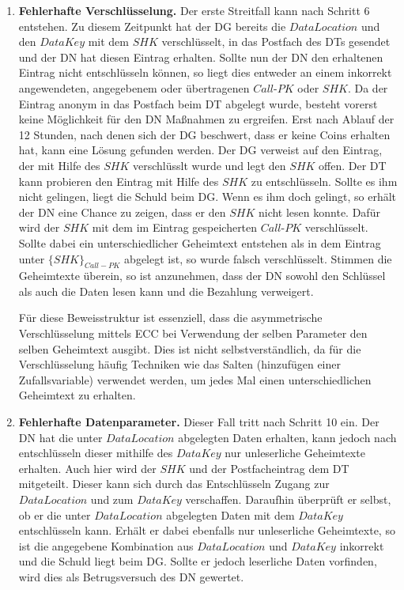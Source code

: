 \documentclass[
	fontsize=11pt,
	headings=small,
	parskip=half,           %
	bibliography=totoc,
	numbers=noenddot,       %
	open=any,               %
]{scrreprt}
\begin{document}
\begin{enumerate}
    \item \textbf{Fehlerhafte Verschlüsselung.}\label{case:IncorrectEncryption}
    Der erste Streitfall kann nach Schritt 6 entstehen. Zu diesem Zeitpunkt hat der DG bereits die $DataLocation$ und den $DataKey$ mit dem $SHK$ verschlüsselt, in das Postfach des DTs gesendet und der DN hat diesen Eintrag erhalten. Sollte nun der DN den erhaltenen Eintrag nicht entschlüsseln können, so liegt dies entweder an einem inkorrekt angewendeten, angegebenem oder übertragenen $Call$-$PK$ oder $SHK$. Da der Eintrag anonym in das Postfach beim DT abgelegt wurde, besteht vorerst keine Möglichkeit für den DN Maßnahmen zu ergreifen. Erst nach Ablauf der 12 Stunden, nach denen sich der DG beschwert, dass er keine Coins erhalten hat, kann eine Lösung gefunden werden. Der DG verweist auf den Eintrag, der mit Hilfe des $SHK$ verschlüsslt wurde und legt den $SHK$ offen. Der DT kann probieren den Eintrag mit Hilfe des $SHK$ zu entschlüsseln. Sollte es ihm nicht gelingen, liegt die Schuld beim DG. Wenn es ihm doch gelingt, so erhält der DN eine Chance zu zeigen, dass er den $SHK$ nicht lesen konnte. Dafür wird der $SHK$ mit dem im Eintrag gespeicherten $Call$-$PK$ verschlüsselt. Sollte dabei ein unterschiedlicher Geheimtext entstehen als in dem Eintrag unter $\{SHK\}_{Call-PK}$ abgelegt ist, so wurde falsch verschlüsselt. Stimmen die Geheimtexte überein, so ist anzunehmen, dass der DN sowohl den Schlüssel als auch die Daten lesen kann und die Bezahlung verweigert. 

    Für diese Beweisstruktur ist essenziell, dass die asymmetrische Verschlüsselung mittels ECC bei Verwendung der selben Parameter den selben Geheimtext ausgibt. Dies ist nicht selbstverständlich, da für die Verschlüsselung häufig Techniken wie das Salten (hinzufügen einer Zufallsvariable) verwendet werden, um jedes Mal einen unterschiedlichen Geheimtext zu erhalten.
    
    
    \item \textbf{Fehlerhafte Datenparameter.}\label{case:IncorrectDataParameters}
    Dieser Fall tritt nach Schritt 10 ein. Der DN hat die unter $DataLocation$ abgelegten Daten erhalten, kann jedoch nach entschlüsseln dieser mithilfe des $DataKey$ nur unleserliche Geheimtexte erhalten. Auch hier wird der $SHK$ und der Postfacheintrag dem DT mitgeteilt. Dieser kann sich durch das Entschlüsseln Zugang zur $DataLocation$ und zum $DataKey$ verschaffen. Daraufhin überprüft er selbst, ob er die unter $DataLocation$ abgelegten Daten mit dem $DataKey$ entschlüsseln kann. Erhält er dabei ebenfalls nur unleserliche Geheimtexte, so ist die angegebene Kombination aus $DataLocation$ und $DataKey$ inkorrekt und die Schuld liegt beim DG. Sollte er jedoch leserliche Daten vorfinden, wird dies als Betrugsversuch des DN gewertet.


\end{enumerate}
\end{document}
